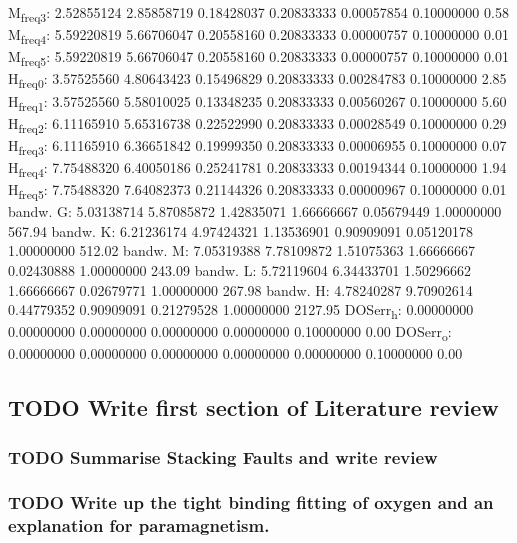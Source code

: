 \documentclass[11pt]{article}
\begin{document}
M\textsubscript{freq}\textsubscript{3}:   2.52855124   2.85858719   0.18428037   0.20833333   0.00057854   0.10000000         0.58
M\textsubscript{freq}\textsubscript{4}:   5.59220819   5.66706047   0.20558160   0.20833333   0.00000757   0.10000000         0.01
M\textsubscript{freq}\textsubscript{5}:   5.59220819   5.66706047   0.20558160   0.20833333   0.00000757   0.10000000         0.01
H\textsubscript{freq}\textsubscript{0}:   3.57525560   4.80643423   0.15496829   0.20833333   0.00284783   0.10000000         2.85
H\textsubscript{freq}\textsubscript{1}:   3.57525560   5.58010025   0.13348235   0.20833333   0.00560267   0.10000000         5.60
H\textsubscript{freq}\textsubscript{2}:   6.11165910   5.65316738   0.22522990   0.20833333   0.00028549   0.10000000         0.29
H\textsubscript{freq}\textsubscript{3}:   6.11165910   6.36651842   0.19999350   0.20833333   0.00006955   0.10000000         0.07
H\textsubscript{freq}\textsubscript{4}:   7.75488320   6.40050186   0.25241781   0.20833333   0.00194344   0.10000000         1.94
H\textsubscript{freq}\textsubscript{5}:   7.75488320   7.64082373   0.21144326   0.20833333   0.00000967   0.10000000         0.01
bandw. G:   5.03138714   5.87085872   1.42835071   1.66666667   0.05679449   1.00000000       567.94
bandw. K:   6.21236174   4.97424321   1.13536901   0.90909091   0.05120178   1.00000000       512.02
bandw. M:   7.05319388   7.78109872   1.51075363   1.66666667   0.02430888   1.00000000       243.09
bandw. L:   5.72119604   6.34433701   1.50296662   1.66666667   0.02679771   1.00000000       267.98
bandw. H:   4.78240287   9.70902614   0.44779352   0.90909091   0.21279528   1.00000000      2127.95
DOSerr\textsubscript{h}:   0.00000000   0.00000000   0.00000000   0.00000000   0.00000000   0.10000000         0.00
DOSerr\textsubscript{o}:   0.00000000   0.00000000   0.00000000   0.00000000   0.00000000   0.10000000         0.00

\subsection{{\bfseries\sffamily TODO} Write first section of Literature review}
\label{sec:org5c322ff}
\subsubsection{{\bfseries\sffamily TODO} Summarise Stacking Faults and write review}
\label{sec:org75741be}
\subsubsection{{\bfseries\sffamily TODO} Write up the tight binding fitting of oxygen and an explanation for paramagnetism.}
\label{sec:orgbe45881}
\end{document}
